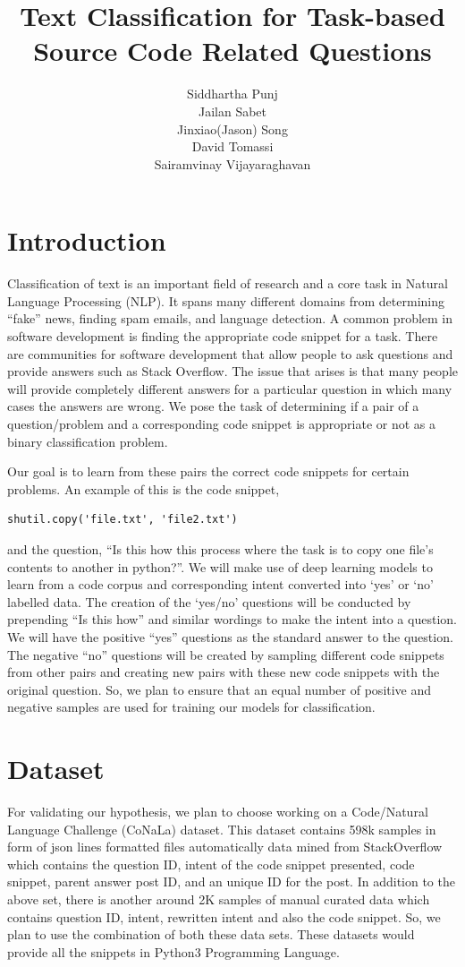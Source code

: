 \documentclass[11pt,a4paper]{article}
\title{Text Classification for Task-based Source Code Related Questions}
\author{
  Siddhartha Punj \\ \And
  Jailan Sabet \\ \And
  Jinxiao(Jason) Song\\ \AND
  David Tomassi\\ \And
  Sairamvinay Vijayaraghavan}
\date{}
\begin{document}
\maketitle
\section{Introduction}
Classification of text is an important field of research and a core
task in Natural Language Processing (NLP). It spans many different
domains from determining “fake” news, finding spam emails, and
language detection. A common problem in software development is
finding the appropriate code snippet for a task. There are communities
for software development that allow people to ask questions and
provide answers such as Stack Overflow. The issue that arises is that
many people will provide completely different answers for a particular
question in which many cases the answers are wrong. We pose the task
of determining if a pair of a question/problem and  a corresponding
code snippet is appropriate or not as a binary classification problem.

Our goal is to learn from these pairs the correct code snippets for
certain problems. An example of this is the code snippet,
\begin{lstlisting}
shutil.copy('file.txt', 'file2.txt')
\end{lstlisting} and the question, “Is this how this process where the task is to copy one file's contents to another in python?”. We will make use
of deep learning models to learn from a code corpus and corresponding
intent converted into ‘yes’ or ‘no’ labelled data. The creation of the
‘yes/no’ questions will be conducted by prepending “Is this how” and
similar wordings to make the intent into a question. We will have the
positive “yes” questions as the standard answer to the question. The
negative “no” questions will be created by sampling different code
snippets from other pairs and creating new pairs with these new code
snippets with the original question. So, we plan to ensure that an
equal number of positive and negative samples are used for training
our models for classification.

\section{Dataset}
For validating our hypothesis, we plan to choose working on a
Code/Natural Language Challenge (CoNaLa) dataset. This dataset
contains 598k samples in form of json lines formatted files automatically data mined from
StackOverflow which contains the question ID, intent of the code
snippet presented, code snippet, parent answer post ID, and an unique
ID for the post. In addition to the above set, there is another around 2K
samples of manual curated data which contains question ID, intent, rewritten
intent and also the code snippet. So, we plan to use the combination
of both these data sets. These datasets would provide all the snippets
in Python3 Programming Language.
\end{document}
